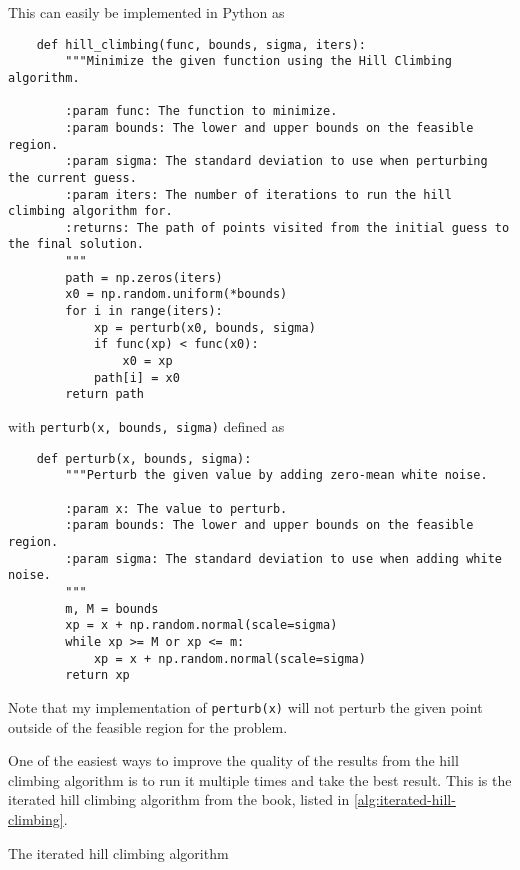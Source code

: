 \documentclass{article}
\begin{document}
This can easily be implemented in Python as

\begin{verbatim}
    def hill_climbing(func, bounds, sigma, iters):
        """Minimize the given function using the Hill Climbing algorithm.

        :param func: The function to minimize.
        :param bounds: The lower and upper bounds on the feasible region.
        :param sigma: The standard deviation to use when perturbing the current guess.
        :param iters: The number of iterations to run the hill climbing algorithm for.
        :returns: The path of points visited from the initial guess to the final solution.
        """
        path = np.zeros(iters)
        x0 = np.random.uniform(*bounds)
        for i in range(iters):
            xp = perturb(x0, bounds, sigma)
            if func(xp) < func(x0):
                x0 = xp
            path[i] = x0
        return path
\end{verbatim}

with \texttt{perturb(x, bounds, sigma)} defined as

\begin{verbatim}
    def perturb(x, bounds, sigma):
        """Perturb the given value by adding zero-mean white noise.

        :param x: The value to perturb.
        :param bounds: The lower and upper bounds on the feasible region.
        :param sigma: The standard deviation to use when adding white noise.
        """
        m, M = bounds
        xp = x + np.random.normal(scale=sigma)
        while xp >= M or xp <= m:
            xp = x + np.random.normal(scale=sigma)
        return xp
\end{verbatim}

Note that my implementation of \texttt{perturb(x)} will not perturb the given point
outside of the feasible region for the problem.

One of the easiest ways to improve the quality of the results from the hill climbing algorithm is
to run it multiple times and take the best result. This is the iterated hill climbing algorithm
from the book, listed in \autoref{alg:iterated-hill-climbing}.

\begin{algorithm}[h]
    \begin{algorithmic}
            \State{}
        \EndFunction{}
    \end{algorithmic}
    \caption{The iterated hill climbing algorithm}\label{alg:iterated-hill-climbing}
\end{algorithm}
\end{document}
